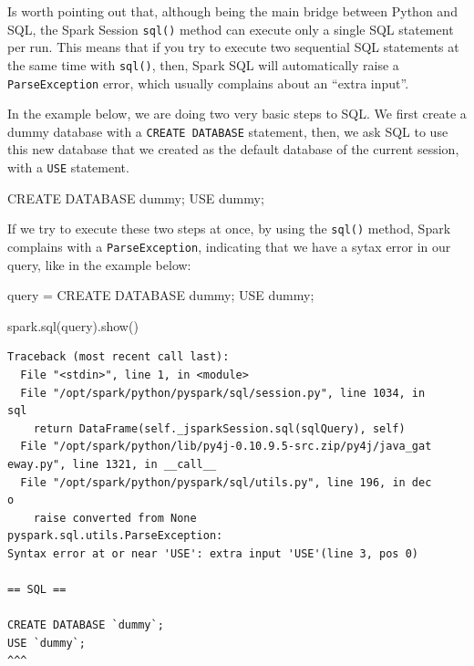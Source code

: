 \documentclass[
  11pt,
  letterpaper,
  DIV=11,
  numbers=noendperiod]{scrreprt}
\newenvironment{Shaded}{\begin{snugshade}}{\end{snugshade}}
\newcommand{\KeywordTok}[1]{\textcolor[rgb]{0.00,0.23,0.31}{#1}}
\newcommand{\NormalTok}[1]{\textcolor[rgb]{0.00,0.23,0.31}{#1}}
\newcommand{\OperatorTok}[1]{\textcolor[rgb]{0.37,0.37,0.37}{#1}}
\newcommand{\StringTok}[1]{\textcolor[rgb]{0.13,0.47,0.30}{#1}}
\begin{document}
Is worth pointing out that, although being the main bridge between
Python and SQL, the Spark Session \texttt{sql()} method can execute only
a single SQL statement per run. This means that if you try to execute
two sequential SQL statements at the same time with \texttt{sql()},
then, Spark SQL will automatically raise a \texttt{ParseException}
error, which usually complains about an ``extra input''.

In the example below, we are doing two very basic steps to SQL. We first
create a dummy database with a \texttt{CREATE\ DATABASE} statement,
then, we ask SQL to use this new database that we created as the default
database of the current session, with a \texttt{USE} statement.

\begin{Shaded}
\begin{Highlighting}[]
\KeywordTok{CREATE} \KeywordTok{DATABASE}\NormalTok{ \textasciigrave{}dummy\textasciigrave{};}
\KeywordTok{USE}\NormalTok{ \textasciigrave{}dummy\textasciigrave{};}
\end{Highlighting}
\end{Shaded}

If we try to execute these two steps at once, by using the
\texttt{sql()} method, Spark complains with a \texttt{ParseException},
indicating that we have a sytax error in our query, like in the example
below:

\begin{Shaded}
\begin{Highlighting}[]
\NormalTok{query }\OperatorTok{=} \StringTok{\textquotesingle{}\textquotesingle{}\textquotesingle{}}
\StringTok{CREATE DATABASE \textasciigrave{}dummy\textasciigrave{};}
\StringTok{USE \textasciigrave{}dummy\textasciigrave{};}
\StringTok{\textquotesingle{}\textquotesingle{}\textquotesingle{}}

\NormalTok{spark.sql(query).show()}
\end{Highlighting}
\end{Shaded}

\begin{verbatim}
Traceback (most recent call last):
  File "<stdin>", line 1, in <module>
  File "/opt/spark/python/pyspark/sql/session.py", line 1034, in 
sql
    return DataFrame(self._jsparkSession.sql(sqlQuery), self)
  File "/opt/spark/python/lib/py4j-0.10.9.5-src.zip/py4j/java_gat
eway.py", line 1321, in __call__
  File "/opt/spark/python/pyspark/sql/utils.py", line 196, in dec
o
    raise converted from None
pyspark.sql.utils.ParseException: 
Syntax error at or near 'USE': extra input 'USE'(line 3, pos 0)

== SQL ==

CREATE DATABASE `dummy`;
USE `dummy`;
^^^
\end{verbatim}
\end{document}
